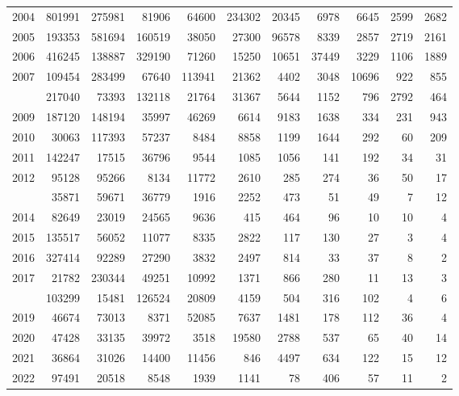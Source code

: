 \documentclass[
]{article}
\begin{document}
\begin{longtable}[t]{lrrrrrrrrrr}
2004 & 801991 & 275981 & 81906 & 64600 & 234302 & 20345 & 6978 & 6645 & 2599 & 2682\\
2005 & 193353 & 581694 & 160519 & 38050 & 27300 & 96578 & 8339 & 2857 & 2719 & 2161\\
2006 & 416245 & 138887 & 329190 & 71260 & 15250 & 10651 & 37449 & 3229 & 1106 & 1889\\
2007 & 109454 & 283499 & 67640 & 113941 & 21362 & 4402 & 3048 & 10696 & 922 & 855\\
\addlinespace
2008 & 217040 & 73393 & 132118 & 21764 & 31367 & 5644 & 1152 & 796 & 2792 & 464\\
2009 & 187120 & 148194 & 35997 & 46269 & 6614 & 9183 & 1638 & 334 & 231 & 943\\
2010 & 30063 & 117393 & 57237 & 8484 & 8858 & 1199 & 1644 & 292 & 60 & 209\\
2011 & 142247 & 17515 & 36796 & 9544 & 1085 & 1056 & 141 & 192 & 34 & 31\\
2012 & 95128 & 95266 & 8134 & 11772 & 2610 & 285 & 274 & 36 & 50 & 17\\
\addlinespace
2013 & 35871 & 59671 & 36779 & 1916 & 2252 & 473 & 51 & 49 & 7 & 12\\
2014 & 82649 & 23019 & 24565 & 9636 & 415 & 464 & 96 & 10 & 10 & 4\\
2015 & 135517 & 56052 & 11077 & 8335 & 2822 & 117 & 130 & 27 & 3 & 4\\
2016 & 327414 & 92289 & 27290 & 3832 & 2497 & 814 & 33 & 37 & 8 & 2\\
2017 & 21782 & 230344 & 49251 & 10992 & 1371 & 866 & 280 & 11 & 13 & 3\\
\addlinespace
2018 & 103299 & 15481 & 126524 & 20809 & 4159 & 504 & 316 & 102 & 4 & 6\\
2019 & 46674 & 73013 & 8371 & 52085 & 7637 & 1481 & 178 & 112 & 36 & 4\\
2020 & 47428 & 33135 & 39972 & 3518 & 19580 & 2788 & 537 & 65 & 40 & 14\\
2021 & 36864 & 31026 & 14400 & 11456 & 846 & 4497 & 634 & 122 & 15 & 12\\
2022 & 97491 & 20518 & 8548 & 1939 & 1141 & 78 & 406 & 57 & 11 & 2\\*
\end{longtable}
\end{document}
